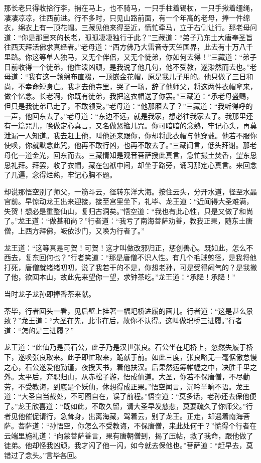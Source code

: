 \documentclass[12pt]{lsbook}
\begin{document}
那长老只得收拾行李，捎在马上，也不骑马，一只手柱着锡杖，一只手揪着缰绳，凄凄凉凉，往西前进。行不多时，只见山路前面，有一个年高的老母，捧一件绵衣，绵衣上有一顶花帽。三藏见他来得至近，慌忙牵马，立于右侧让行。那老母问道：“你是那里来的长老，孤孤凄凄独行于此？”三藏道：“弟子乃东土大唐奉圣旨往西天拜活佛求真经者。”老母道：“西方佛乃大雷音寺天竺国界，此去有十万八千里路。你这等单人独马，又无个伴侣，又无个徒弟，你如何去得！”三藏道：“弟子日前收得一个徒弟，他性泼凶顽，是我说了他几句，他不受教，遂渺然而去也。”老母道：“我有这一领绵布直裰，一顶嵌金花帽，原是我儿子用的。他只做了三日和尚，不幸命短身亡。我才去他寺里，哭了一场，辞了他师父，将这两件衣帽拿来，做个忆念。长老啊，你既有徒弟，我把这衣帽送了你罢。”三藏道：“承老母盛赐，但只是我徒弟已走了，不敢领受。”老母道：“他那厢去了？”三藏道：“我听得呼的一声，他回东去了。”老母道：“东边不远，就是我家，想必往我家去了。我那里还有一篇咒儿，唤做定心真言，又名做紧箍儿咒。你可暗暗的念熟，牢记心头，再莫泄漏一人知道。我去赶上他，叫他还来跟你，你却将此衣帽与他穿戴。他若不服你使唤，你就默念此咒，他再不敢行凶，也再不敢去了。”三藏闻言，低头拜谢。那老母化一道金光，回东而去。三藏情知是观音菩萨授此真言，急忙撮土焚香，望东恳恳礼拜。拜罢，收了衣帽，藏在包袱中间，却坐于路旁，诵习那定心真言。来回念了几遍，念得烂熟，牢记心胸不题。

却说那悟空别了师父，一筋斗云，径转东洋大海。按住云头，分开水道，径至水晶宫前。早惊动龙王出来迎接，接至宫里坐下，礼毕、龙王道：“近闻得大圣难满，失贺！想必是重整仙山，复归古洞矣。”悟空道：“我也有此心性，只是又做了和尚了。”龙王道：“做甚和尚？”行者道：“我亏了南海菩萨劝善，教我正果，随东土唐僧，上西方拜佛，皈依沙门，又唤为行者了。”

龙王道：“这等真是可贺！可贺！这才叫做改邪归正，惩创善心。既如此，怎么不西去，复东回何也？”行者笑道：“那是唐僧不识人性。有几个毛贼剪径，是我将他打死，唐僧就绪绪叨叨，说了我若干的不是，你想老孙，可是受得闷气的？是我撇了他，欲回本山，故此先来望你一望，求钟茶吃。”龙王道：“承降！承降！”

当时龙子龙孙即捧香茶来献。

茶毕，行者回头一看，见后壁上挂著一幅圯桥进履的画儿。行者道：“这是甚么景致？”龙王道：“大圣在先，此事在后，故你不认得。这叫做圯桥三进履。”行者道：“怎的是三进履？”

龙王道：“此仙乃是黄石公，此子乃是汉世张良。石公坐在圯桥上，忽然失履于桥下，遂唤张良取来。此子即忙取来，跪献于前。如此三度，张良略无一毫倨傲怠慢之心，石公遂爱他勤谨，夜授天书，着他扶汉。后果然运筹帷幄之中，决胜千里之外。太平后，弃职归山，从赤松子游，悟成仙道。大圣，你若不保唐僧，不尽勤劳，不受教诲，到底是个妖仙，休想得成正果。”悟空闻言，沉吟半晌不语。龙王道：“大圣自当裁处，不可图自在，误了前程。”悟空道：“莫多话，老孙还去保他便了。”龙王欣喜道：“既如此，不敢久留，请大圣早发慈悲，莫要疏久了你师父。”行者见他催促请行，急耸身，出离海藏，驾着云，别了龙王。正走，却遇着南海菩萨。菩萨道：“孙悟空，你怎么不受教诲，不保唐僧，来此处何干？”慌得个行者在云端里施礼道：“向蒙菩萨善言，果有唐朝僧到，揭了压帖，救了我命，跟他做了徒弟。他却怪我凶顽，我才闪了他一闪，如今就去保他也。”菩萨道：“赶早去，莫错过了念头。”言毕各回。
\end{document}
